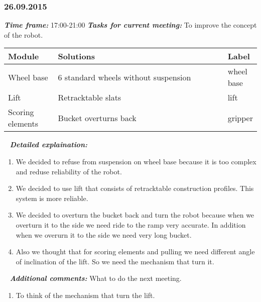 \subsubsection{26.09.2015}
	\textit{\textbf{Time frame:}} 17:00-21:00 \newline \newline
	\textit{\textbf{Tasks for current meeting:}} To improve the concept of the robot.

  \begin{table}[H]
	\vspace{-2mm}
	\begin{center}
		\begin{tabular}{|p{0.2\linewidth}|p{0.7\linewidth}|p{0.1\linewidth}|}
			\hline
			Module & Solutions & Label \\
			\hline
			Wheel base & 6 standard wheels without suspension & wheel base \\
			\hline
			Lift & Retracktable slats & lift \\
			\hline
			Scoring elements & Bucket overturns back & gripper \\
		\end{tabular}
	\end{center}
  \end{table}
  
   \newline
  \textit{\textbf{Detailed explaination:}}
  \begin{enumerate}
  	\item We decided to refuse from suspension on wheel base because it is too complex and reduse reliability of the robot.
  	
  	\item We decided to use lift that consists of retracktable construction profiles. This system is more reliable.
  	
  	\item We decided to overturn the bucket back and turn the robot because when we overturn it to the side we need ride to the ramp very accurate. In addition when we overurn it to the side we need very long bucket. 
  	
  	\item Also we thought that for scoring elements and pulling we need different angle of inclination of the lift. So we need the mechanism that turn it.
  	
  \end{enumerate}
  
   \newline
  \textit{\textbf{Additional comments:}} What to do the next meeting.
  \begin{enumerate}
  	\item To think of the mechanism that turn the lift.
  \end{enumerate}
  
    \newline

\fillpage
